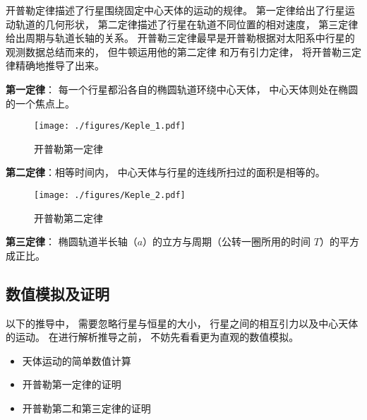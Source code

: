 

开普勒定律描述了行星围绕固定中心天体的运动的规律。 第一定律给出了行星运动轨道的几何形状， 第二定律描述了行星在轨道不同位置的相对速度， 第三定律给出周期与轨道长轴的关系。 开普勒三定律最早是开普勒根据对太阳系中行星的观测数据总结而来的， 但牛顿运用他的第二定律 和万有引力定律， 将开普勒三定律精确地推导了出来。

\textbf{第一定律}： 每一个行星都沿各自的椭圆轨道环绕中心天体， 中心天体则处在椭圆的一个焦点上。
\begin{figure}[ht]
\centering
\texttt{[image: ./figures/Keple\_1.pdf]}
\caption{开普勒第一定律} \label{Keple_fig1}
\end{figure}

\textbf{第二定律}：相等时间内， 中心天体与行星的连线所扫过的面积是相等的。
\begin{figure}[ht]
\centering
\texttt{[image: ./figures/Keple\_2.pdf]}
\caption{开普勒第二定律} \label{Keple_fig2}
\end{figure}

\textbf{第三定律}： 椭圆轨道半长轴（$a$）的立方与周期（公转一圈所用的时间 $T$）的平方成正比。

\subsection{数值模拟及证明}

以下的推导中， 需要忽略行星与恒星的大小， 行星之间的相互引力以及中心天体的运动。 在进行解析推导之前， 不妨先看看更为直观的数值模拟。
 
\begin{itemize}
\item 天体运动的简单数值计算
\item 开普勒第一定律的证明
\item 开普勒第二和第三定律的证明
\end{itemize}
 
